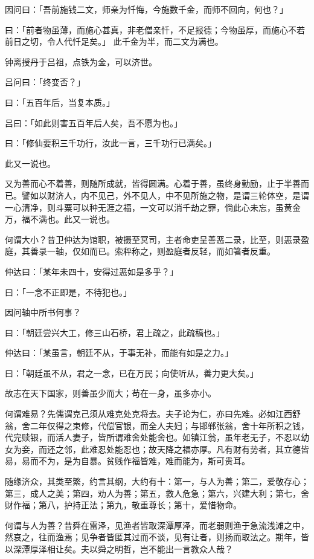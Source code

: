 \documentclass[12pt,twoside,openany]{book}
\begin{document}
因问曰：「吾前施钱二文，师亲为忏悔，今施数千金，而师不回向，何也？」

曰：「前者物虽薄，而施心甚真，非老僧亲忏，不足报德；今物虽厚，而施心不若前日之切，令人代忏足矣。」 此千金为半，而二文为满也。

钟离授丹于吕祖，点铁为金，可以济世。

吕问曰：「终变否？」

曰：「五百年后，当复本质。」

吕曰：「如此则害五百年后人矣，吾不愿为也。」

曰：「修仙要积三千功行，汝此一言，三千功行已满矣。」

此又一说也。

又为善而心不着善，则随所成就，皆得圆满。心着于善，虽终身勤励，止于半善而已。譬如以财济人，内不见己，外不见人，中不见所施之物，是谓三轮体空，是谓一心清净，则斗粟可以种无涯之福，一文可以消千劫之罪，倘此心未忘，虽黄金万，福不满也。此又一说也。

何谓大小？昔卫仲达为馆职，被摄至冥司，主者命吏呈善恶二录，比至，则恶录盈庭，其善录一轴，仅如而已。索秤称之，则盈庭者反轻，而如箸者反重。

仲达曰：「某年未四十，安得过恶如是多乎？」

曰：「一念不正即是，不待犯也。」

因问轴中所书何事？

曰：「朝廷尝兴大工，修三山石桥，君上疏之，此疏稿也。」

仲达曰：「某虽言，朝廷不从，于事无补，而能有如是之力。」

曰：「朝廷虽不从，君之一念，已在万民；向使听从，善力更大矣。」

故志在天下国家，则善虽少而大；苟在一身，虽多亦小。

何谓难易？先儒谓克己须从难克处克将去。夫子论为仁，亦曰先难。必如江西舒翁，舍二年仅得之束修，代偿官银，而全人夫妇；与邯郸张翁，舍十年所积之钱，代完赎银，而活人妻子，皆所谓难舍处能舍也。如镇江翁，虽年老无子，不忍以幼女为妾，而还之邻，此难忍处能忍也；故天降之福亦厚。凡有财有势者，其立德皆易，易而不为，是为自暴。贫贱作福皆难，难而能为，斯可贵耳。

随缘济众，其类至繁，约言其纲，大约有十：第一，与人为善；第二，爱敬存心；第三，成人之美；第四，劝人为善；第五，救人危急；第六，兴建大利；第七，舍财作福；第八，护持正法；第九，敬重尊长；第十，爱惜物命。

何谓与人为善？昔舜在雷泽，见渔者皆取深潭厚泽，而老弱则渔于急流浅滩之中，然哀之，往而渔焉；见争者皆匿其过而不谈，见有让者，则扬而取法之。期年，皆以深潭厚泽相让矣。夫以舜之明哲，岂不能出一言教众人哉？
\end{document}
